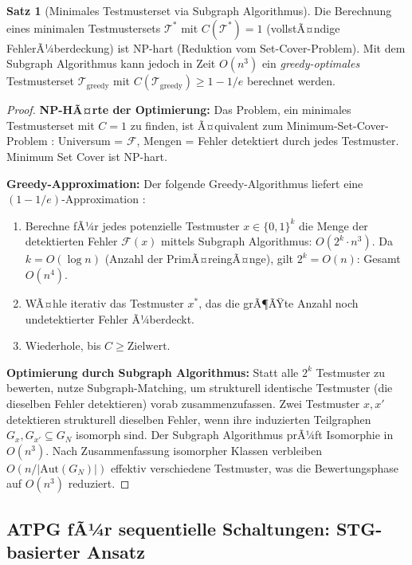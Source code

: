 ﻿\documentclass[a4paper,12pt]{article}
\theoremstyle{definition}
\newtheorem{satz}{Satz}
\begin{document}
\begin{satz}[Minimales Testmusterset via Subgraph Algorithmus]\label{satz:mintest}
  Die Berechnung eines minimalen Testmustersets $\mathcal{T}^*$ mit
  $C(\mathcal{T}^*) = 1$ (vollstÃ¤ndige FehlerÃ¼berdeckung) ist NP-hart
  \cite{garey1979computers} (Reduktion vom Set-Cover-Problem). Mit dem Subgraph
  Algorithmus kann jedoch in Zeit $O(n^3)$ ein \emph{greedy-optimales} Testmusterset
  $\mathcal{T}_{\text{greedy}}$ mit $C(\mathcal{T}_{\text{greedy}}) \geq 1 - 1/e$
  berechnet werden.
\end{satz}

\begin{proof}
  \textbf{NP-HÃ¤rte der Optimierung:} Das Problem, ein minimales Testmusterset mit
  $C = 1$ zu finden, ist Ã¤quivalent zum Minimum-Set-Cover-Problem
  \cite{garey1979computers}: Universum = $\mathcal{F}$, Mengen = Fehler detektiert
  durch jedes Testmuster. Minimum Set Cover ist NP-hart.

  \textbf{Greedy-Approximation:} Der folgende Greedy-Algorithmus liefert eine
  $(1-1/e)$-Approximation \cite{cormen2022}:
  \begin{enumerate}
    \item Berechne fÃ¼r jedes potenzielle Testmuster $x \in \{0,1\}^k$ die Menge
          der detektierten Fehler $\mathcal{F}(x)$ mittels Subgraph Algorithmus:
          $O(2^k \cdot n^3)$. Da $k = O(\log n)$ (Anzahl der PrimÃ¤reingÃ¤nge), gilt
          $2^k = O(n)$: Gesamt $O(n^4)$.
    \item WÃ¤hle iterativ das Testmuster $x^*$, das die grÃ¶ÃŸte Anzahl noch
          undetektierter Fehler Ã¼berdeckt.
    \item Wiederhole, bis $C \geq \text{Zielwert}$.
  \end{enumerate}

  \textbf{Optimierung durch Subgraph Algorithmus:} Statt alle $2^k$ Testmuster
  zu bewerten, nutze Subgraph-Matching, um strukturell identische Testmuster
  (die dieselben Fehler detektieren) vorab zusammenzufassen. Zwei Testmuster $x, x'$
  detektieren strukturell dieselben Fehler, wenn ihre induzierten Teilgraphen
  $G_{x}, G_{x'} \subseteq G_N$ isomorph sind. Der Subgraph Algorithmus prÃ¼ft Isomorphie
  in $O(n^3)$. Nach Zusammenfassung isomorpher Klassen verbleiben $O(n / |\text{Aut}(G_N)|)$
  effektiv verschiedene Testmuster, was die Bewertungsphase auf $O(n^3)$ reduziert.
\end{proof}

\subsection{ATPG fÃ¼r sequentielle Schaltungen: STG-basierter Ansatz}
\end{document}
